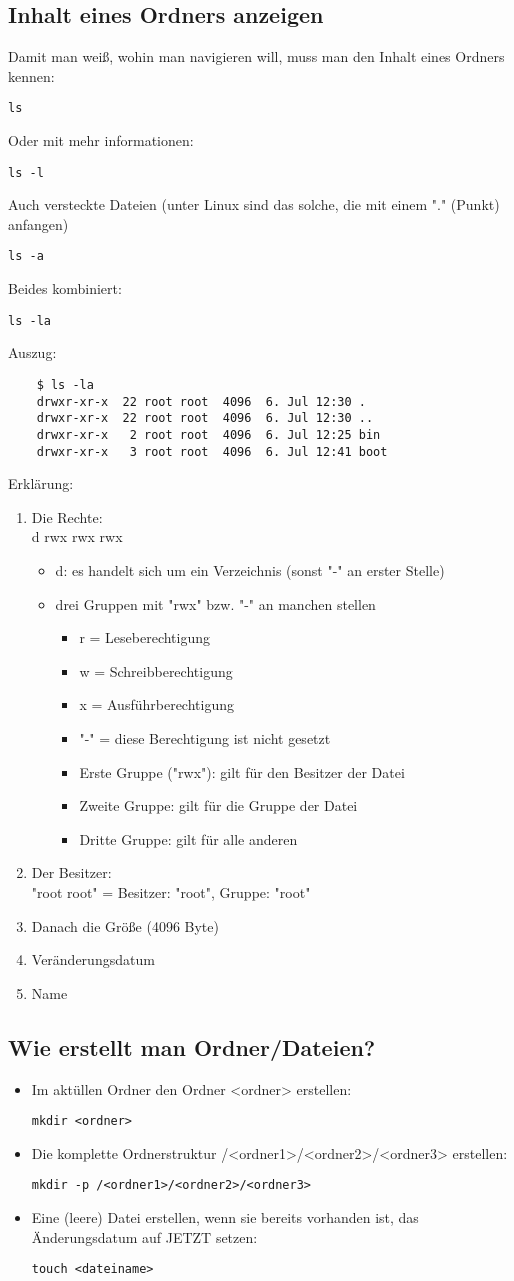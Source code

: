 \documentclass[a4paper,10pt]{article}
\newcommand{\befehl}[1]{
  \begin{center}
    \texttt{#1}
  \end{center}
}
\begin{document}
    \subsection{Inhalt eines Ordners anzeigen}
      Damit man weiß, wohin man navigieren will, muss man den Inhalt eines Ordners kennen:  
      \befehl{ls} 
      Oder mit mehr informationen: 
      \befehl{ls -l} 
      Auch versteckte Dateien (unter Linux sind das solche, die mit einem "." (Punkt) anfangen)
      \befehl{ls -a} 
      Beides kombiniert:
      \befehl{ls -la} 
      Auszug: 
      \begin{verbatim}
	$ ls -la
	drwxr-xr-x  22 root root  4096  6. Jul 12:30 .
	drwxr-xr-x  22 root root  4096  6. Jul 12:30 ..
	drwxr-xr-x   2 root root  4096  6. Jul 12:25 bin
	drwxr-xr-x   3 root root  4096  6. Jul 12:41 boot
      \end{verbatim}
      Erklärung: 
      \begin{enumerate}
	\item Die Rechte: \\
	  d rwx rwx rwx
	  \begin{itemize}
	    \item d: es handelt sich um ein Verzeichnis (sonst "-" an erster Stelle)
	    \item drei Gruppen mit "rwx" bzw. "-" an manchen stellen
	      \begin{itemize}
		\item r = Leseberechtigung
		\item w = Schreibberechtigung
		\item x = Ausführberechtigung
		\item "-" = diese Berechtigung ist nicht gesetzt
		\item Erste Gruppe ("rwx"): gilt für den Besitzer der Datei
		\item Zweite Gruppe: gilt für die Gruppe der Datei
		\item Dritte Gruppe: gilt für alle anderen
	      \end{itemize}
	  \end{itemize}
	\item Der Besitzer: \\
	  "root root" = Besitzer: "root", Gruppe: "root"
	\item Danach die Größe (4096 Byte)
	\item Veränderungsdatum
	\item Name
      \end{enumerate}

    \subsection{Wie erstellt man Ordner/Dateien?}
      \begin{itemize}
	\item Im aktüllen Ordner den Ordner <ordner> erstellen: 
	  \befehl{mkdir <ordner>} 
	\item Die komplette Ordnerstruktur /<ordner1>/<ordner2>/<ordner3> erstellen: 
	  \befehl{mkdir -p /<ordner1>/<ordner2>/<ordner3>}
	\item Eine (leere) Datei erstellen, wenn sie bereits vorhanden ist, das Änderungsdatum auf JETZT setzen: 
	  \befehl{touch <dateiname>}
      \end{itemize}
\end{document}
